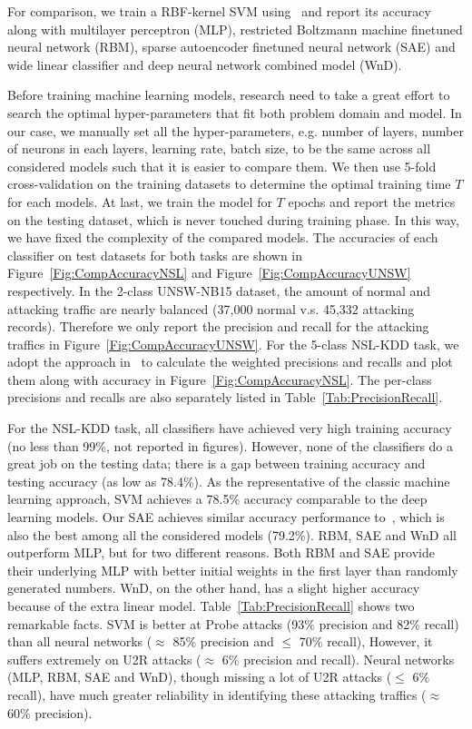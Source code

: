 For comparison, we train a RBF-kernel SVM using~\cite{ScikitLearnSVM} and report its accuracy along
with multilayer perceptron (MLP), restricted Boltzmann machine finetuned neural network (RBM),
sparse autoencoder finetuned neural network (SAE) and wide linear classifier and deep neural network combined model (WnD).

Before training machine learning models, research need to take a great effort to search
the optimal hyper-parameters that fit both problem domain and model.
In our case, we manually set all the hyper-parameters, e.g. number of layers, number of neurons
in each layers, learning rate, batch size, to be the same across all considered models such that
it is easier to compare them.
We then use 5-fold cross-validation on the training datasets to determine the optimal training time $T$
for each models.
At last, we train the model for $T$ epochs and report the metrics on the testing dataset,
which is never touched during training phase.
In this way, we have fixed the complexity of the compared models.
The accuracies of each classifier on test datasets for both tasks are
shown in Figure~\ref{Fig:CompAccuracyNSL} and Figure~\ref{Fig:CompAccuracyUNSW} respectively.
In the 2-class UNSW-NB15 dataset,
the amount of normal and attacking traffic are nearly balanced (37,000 normal v.s. 45,332 attacking records).
Therefore we only report the precision and recall for the attacking traffics in Figure~\ref{Fig:CompAccuracyUNSW}.
For the 5-class NSL-KDD task, we adopt the approach in~\cite{STL-NIDS}
to calculate the weighted precisions and recalls and plot them along with accuracy in Figure~\ref{Fig:CompAccuracyNSL}.
The per-class precisions and recalls are also separately listed in Table~\ref{Tab:PrecisionRecall}.

For the NSL-KDD task, all classifiers have achieved very high training accuracy (no less than 99\%, not reported in figures).
However, none of the classifiers do a great job on the testing data;
there is a gap between training accuracy and testing accuracy (as low as 78.4\%).
As the representative of the classic machine learning approach, SVM achieves a 78.5\% accuracy
comparable to the deep learning models.
Our SAE achieves similar accuracy performance to~\cite{STL-NIDS}, which is
also the best among all the considered models (79.2\%).
RBM, SAE and WnD all outperform MLP, but for two different reasons.
Both RBM and SAE provide their underlying MLP with better initial weights in the first layer
than randomly generated numbers.
WnD, on the other hand, has a slight higher accuracy because of the extra linear model.
Table~\ref{Tab:PrecisionRecall} shows two remarkable facts.
SVM is better at Probe attacks (93\% precision and 82\% recall)
than all neural networks ($\approx$ 85\% precision and $\leq$ 70\% recall),
However, it suffers extremely on U2R attacks ($\approx$ 6\% precision and recall).
Neural networks (MLP, RBM, SAE and WnD), though missing a lot of U2R attacks ($\leq$ 6\% recall),
have much greater reliability in identifying these attacking traffics ($\approx$ 60\% precision).

